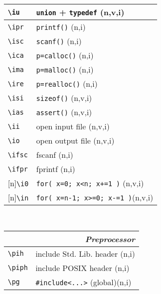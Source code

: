 \documentclass[oneside,11pt,landscape,DIV16]{scrartcl}
\newcommand{\Rep}{{\tiny{[n]}}}
\begin{document}
\begin{multicols}{3}
\begin{center}
\begin{tabular}[]{|p{11mm}|p{60mm}|}
\hline \verb'\iu'  & \verb'union'  + \verb'typedef'     \hfill (n,v,i)\\
\hline \verb'\ipr' & \verb'printf()'                    \hfill (n,i)\\
\hline \verb'\isc' & \verb'scanf()'                     \hfill (n,i)\\
\hline \verb'\ica' & \verb'p=calloc()'                  \hfill (n,i)\\
\hline \verb'\ima' & \verb'p=malloc()'                  \hfill (n,i)\\
\hline \verb'\ire' & \verb'p=realloc()'                 \hfill (n,i)\\
\hline \verb'\isi' & \verb'sizeof()'                    \hfill (n,v,i)\\
\hline \verb'\ias' & \verb'assert()'                    \hfill (n,v,i)\\
\hline \verb'\ii'  & open input file                    \hfill (n,v,i)\\
\hline \verb'\io'  & open output file                   \hfill (n,v,i)\\
\hline \verb'\ifsc'& fscanf                             \hfill (n,i)\\
\hline \verb'\ifpr'& fprintf                            \hfill (n,i)\\
\hline \Rep\verb'\i0'  & \verb'for( x=0; x<n; x+=1 )'   \hfill (n,v,i)\\
\hline \Rep\verb'\in'  & \verb'for( x=n-1; x>=0; x-=1 )'\hfill (n,v,i)\\
\hline
\end{tabular} \\
%
%
\begin{tabular}[]{|p{11mm}|p{60mm}|}%
\hline
\multicolumn{2}{|r|}{\textsl{\textbf{P}reprocessor}}   \\
\hline \verb'\pih'  & include Std. Lib. header     \hfill (n,i)\\
\hline \verb'\piph' & include POSIX header         \hfill (n,i)\\
\hline \verb'\pg'   & \verb$#include<...>$ (global)\hfill (n,i)\\

\end{tabular}
\end{center}
\end{multicols}
\end{document}
